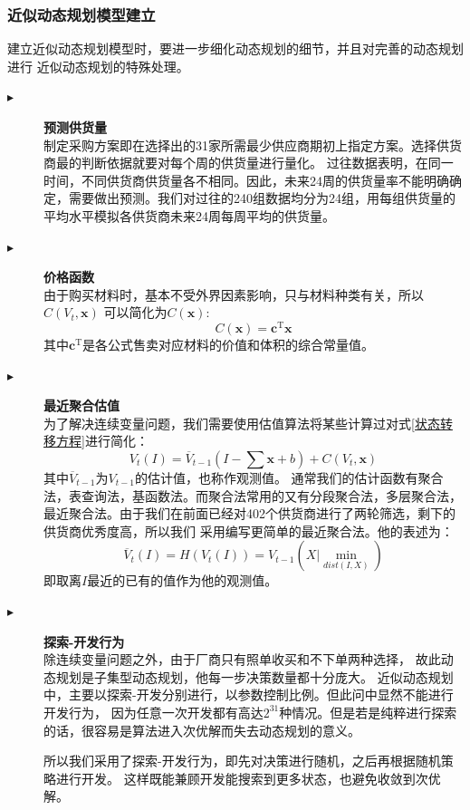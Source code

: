 \documentclass{cumcmthesis}
\begin{document}
\subsubsection*{近似动态规划模型建立}
建立近似动态规划模型时，要进一步细化动态规划的细节，并且对完善的动态规划进行
近似动态规划的特殊处理。
\begin{description}
    \item[$\blacktriangleright$] \textbf{预测供货量} \\
        制定采购方案即在选择出的31家所需最少供应商期初上指定方案。选择供货商最的判断依据就要对每个周的供货量进行量化。
        过往数据表明，在同一时间，不同供货商供货量各不相同。因此，未来24周的供货量率不能明确确定，需要做出预测。我们对过往的240组数据均分为24组，用每组供货量的平均水平模拟各供货商未来24周每周平均的供货量。
    \item[$\blacktriangleright$] \textbf{价格函数} \\
        由于购买材料时，基本不受外界因素影响，只与材料种类有关，所以$C(V_t,\bm{x})$
        可以简化为$C(\bm{x})$:
        $$
            C(\bm{x}) = \bm{c}^{\text{T}}\bm{x}
        $$
        其中$\bm{c}^{\text{T}}$是各公式售卖对应材料的价值和体积的综合常量值。
    \item[$\blacktriangleright$] \textbf{最近聚合估值} \\
        为了解决连续变量问题，我们需要使用估值算法将某些计算过对式\ref{状态转移方程}进行简化：
        $$
            V_t(I) = \overline{ V }_{t-1} (I - \sum \bm{x} + b) + C(V_t,\bm{x})
        $$
        其中$\overline{V}_{t-1}$为$V_{t-1}$的估计值，也称作观测值。
        通常我们的估计函数有聚合法，表查询法，基函数法。而聚合法常用的又有分段聚合法，多层聚合法，
        最近聚合法。由于我们在前面已经对402个供货商进行了两轮筛选，剩下的供货商优秀度高，所以我们
        采用编写更简单的最近聚合法。他的表述为：
        $$
            \overline{V}_t(I) = H(V_t(I)) = V_{t-1}(\left. X \right| \min_{dist(I,X)})
        $$
        即取离$I$最近的已有的值作为他的观测值。
    \item[$\blacktriangleright$] \textbf{探索-开发行为} \\
        除连续变量问题之外，由于厂商只有照单收买和不下单两种选择，
        故此动态规划是子集型动态规划，他每一步决策数量都十分庞大。
        近似动态规划中，主要以探索-开发分别进行，以参数控制比例。但此问中显然不能进行开发行为，
        因为任意一次开发都有高达$2^{31}$种情况。但是若是纯粹进行探索
        的话，很容易是算法进入次优解而失去动态规划的意义。\par
        所以我们采用了探索-开发行为，即先对决策进行随机，之后再根据随机策略进行开发。
        这样既能兼顾开发能搜索到更多状态，也避免收敛到次优解。
\end{description}
\end{document}
